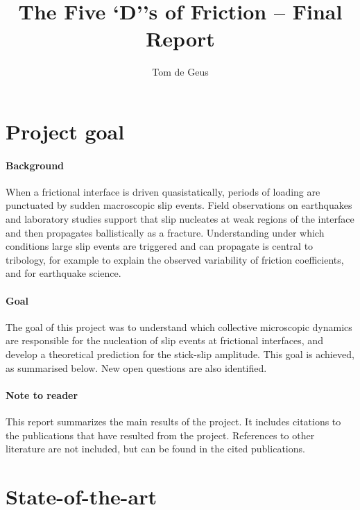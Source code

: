 \documentclass{goose-article}
\title{The Five `D''s of Friction -- Final Report}
\author{Tom de Geus}
\begin{document}
\twocolumn[
    \begin{@twocolumnfalse}
        \maketitle
    \end{@twocolumnfalse}
]
\sloppy

\section{Project goal}

\paragraph{Background}

When a frictional interface is driven quasistatically, periods of loading are punctuated by sudden macroscopic slip events.
Field observations on earthquakes and laboratory studies support that slip nucleates at weak regions of the interface and then propagates ballistically as a fracture.
Understanding under which conditions large slip events are triggered and can propagate is central to tribology, for example to explain the observed variability of friction coefficients, and for earthquake science.

\paragraph{Goal}

The goal of this project was to understand which collective microscopic dynamics are responsible for the nucleation of slip events at frictional interfaces, and develop a theoretical prediction for the stick-slip amplitude.
This goal is achieved, as summarised below.
New open questions are also identified.

\paragraph{Note to reader}

This report summarizes the main results of the project.
It includes citations to the publications that have resulted from the project.
References to other literature are not included, but can be found in the cited publications.

\section{State-of-the-art}
\end{document}
